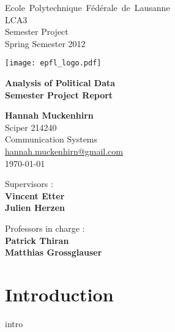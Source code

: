 \documentclass[a4paper,10.5pt]{article}
\title{\bsc{Analysis of Political Data}}
\author{Hannah \bsc{Muckenhirn}}
\date{Spring 2012}
\begin{document}
\pagestyle{fancy}
{\normalsize
\begin{multicols}{2}
\noindent \mbox{Ecole Polytechnique Fédérale de Lausanne}\\
LCA3\\
Semester Project\\
Spring Semester 2012\\
\begin{flushright}
{\texttt{[image: epfl\_logo.pdf]}} \\
\end{flushright}
\end{multicols}
}

\vspace{4cm}

\begin{center}
\thispagestyle{empty}
{\Huge\bf Analysis of Political Data} \\
\vspace{2cm}
{\Large\bf
Semester Project Report
}
\vspace{3cm}

\textbf{Hannah Muckenhirn} \\
Sciper 214240 \\
Communication Systems \\
\href{mailto:hannah.muckenhirn@gmail.com}{hannah.muckenhirn@gmail.com} \\

\vspace{3cm}
\today

\vfill
\hfill
{\normalsize
\begin{multicols}{2}
\begin{flushleft}
Supervisors : \\
\textbf{Vincent Etter} \\
\textbf{Julien Herzen}\\
\end{flushleft}

\begin{flushright}
Professors in charge : \\
\textbf{Patrick Thiran} \\
\textbf{Matthias Grossglauser}\\
\end{flushright}

\end{multicols}
}

\end{center}
\newpage
\tableofcontents
\newpage
\section{Introduction}
intro
\end{document}
